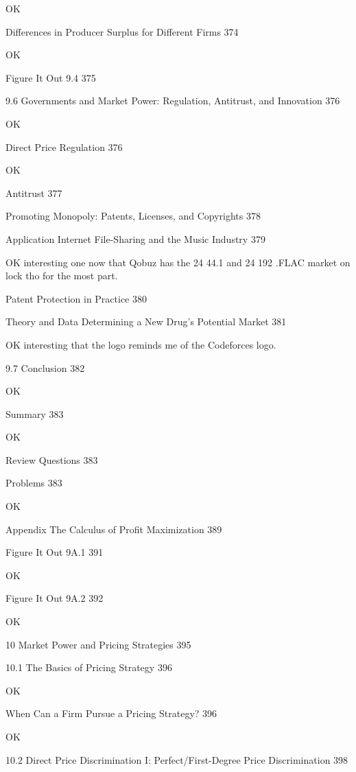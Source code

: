 OK

Differences in Producer Surplus for Different Firms 374

OK

Figure It Out 9.4 375



9.6 Governments and Market Power: Regulation, Antitrust, and Innovation 376

OK

Direct Price Regulation 376

OK

Antitrust 377



Promoting Monopoly: Patents, Licenses, and Copyrights 378



Application Internet File-Sharing and the Music Industry 379

OK interesting one now that Qobuz has the 24 44.1 and 24 192 .FLAC market on lock tho for the most part.

Patent Protection in Practice 380



Theory and Data Determining a New Drug's Potential Market 381

OK interesting that the logo reminds me of the Codeforces logo.

9.7 Conclusion 382

OK

Summary 383

OK

Review Questions 383



Problems 383

OK

Appendix The Calculus of Profit Maximization 389



Figure It Out 9A.1 391

OK

Figure It Out 9A.2 392

OK

10 Market Power and Pricing Strategies 395



10.1 The Basics of Pricing Strategy 396

OK

When Can a Firm Pursue a Pricing Strategy? 396

OK

10.2 Direct Price Discrimination I: Perfect/First-Degree Price Discrimination 398



